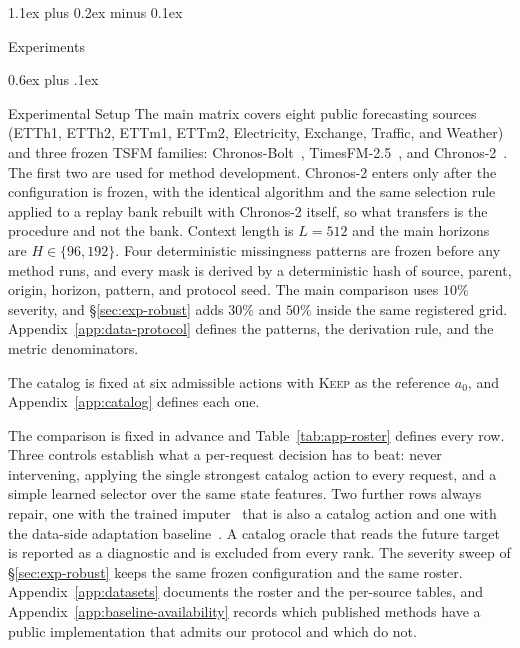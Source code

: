 \documentclass{article}
\makeatletter
\newcommand{\tsfm}{TSFM}
\def\section{\@startsection{section}{1}{\z@}{-1.6ex plus -0.5ex minus -.2ex}%
  {1.1ex plus 0.2ex minus 0.1ex}{\large\sc\raggedright}}
\def\subsection{\@startsection{subsection}{2}{\z@}{-1.4ex plus -0.4ex minus -.2ex}%
  {0.6ex plus .1ex}{\normalsize\sc\raggedright}}
\makeatother
\begin{document}
\section{Experiments}
\label{sec:exp}

\subsection{Experimental Setup}
\label{sec:exp-setup}
The main matrix covers eight public forecasting sources (ETTh1, ETTh2, ETTm1, ETTm2,
Electricity, Exchange, Traffic, and Weather) and three frozen \tsfm{} families:
Chronos-Bolt~\citep{chronosbolt2025}, TimesFM-2.5~\citep{das2024timesfm}, and
Chronos-2~\citep{chronos2_2025}. The first two are used for method development. Chronos-2
enters only after the configuration is frozen, with the identical algorithm and the same
selection rule applied to a replay bank rebuilt with Chronos-2 itself, so what transfers is the
procedure and not the bank.
Context length is $L = 512$ and the main horizons are $H \in \{96, 192\}$. Four deterministic
missingness patterns are frozen before any method runs, and every mask is derived by a
deterministic hash of source, parent, origin, horizon, pattern, and protocol seed. The main
comparison uses $10\%$ severity, and \S\ref{sec:exp-robust} adds $30\%$ and $50\%$ inside the
same registered grid. Appendix~\ref{app:data-protocol} defines the patterns, the derivation
rule, and the metric denominators.

The catalog is fixed at six admissible actions with \textsc{Keep} as the reference $a_0$, and
Appendix~\ref{app:catalog} defines each one.

The comparison is fixed in advance and Table~\ref{tab:app-roster} defines every row. Three
controls establish what a per-request decision has to beat: never intervening, applying the
single strongest catalog action to every request, and a simple learned selector over the same
state features. Two further rows always repair, one with the trained
imputer~\citep{du2023saits,du2023pypots} that is also a catalog action and one with the
data-side adaptation baseline~\citep{qiu2026tato}. A catalog oracle that reads the future
target is reported as a diagnostic and is excluded from every rank.
The severity sweep of \S\ref{sec:exp-robust} keeps the same frozen configuration and the same
roster. Appendix~\ref{app:datasets} documents the roster and the per-source tables, and
Appendix~\ref{app:baseline-availability} records which published methods have a public
implementation that admits our protocol and which do not.
\end{document}
